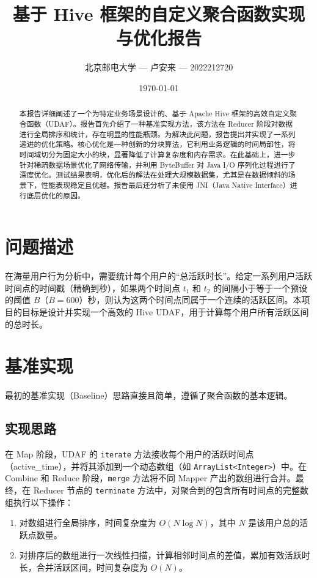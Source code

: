 \documentclass[UTF8]{ctexart}
\title{\textbf{基于 Hive 框架的自定义聚合函数实现与优化报告}}
\author{北京邮电大学 --- 卢安来 --- 2022212720}
\date{\today}
\begin{document}
\maketitle

\begin{abstract}
\noindent 本报告详细阐述了一个为特定业务场景设计的、基于 Apache Hive 框架的高效自定义聚合函数（UDAF）。报告首先介绍了一种基准实现方法，该方法在 Reducer 阶段对数据进行全局排序和统计，存在明显的性能瓶颈。为解决此问题，报告提出并实现了一系列递进的优化策略。核心优化是一种创新的分块算法，它利用业务逻辑的时间局部性，将时间域切分为固定大小的块，显著降低了计算复杂度和内存需求。在此基础上，进一步针对稀疏数据场景优化了网络传输，并利用 ByteBuffer 对 Java I/O 序列化过程进行了深度优化。测试结果表明，优化后的解法在处理大规模数据集，尤其是在数据倾斜的场景下，性能表现稳定且优越。报告最后还分析了未使用 JNI（Java Native Interface）进行底层优化的原因。
\end{abstract}

\newpage
\tableofcontents
\newpage

\section{问题描述}
在海量用户行为分析中，需要统计每个用户的“总活跃时长”。给定一系列用户活跃时间点的时间戳（精确到秒），如果两个时间点 $t_1$ 和 $t_2$ 的间隔小于等于一个预设的阈值 $B$（$B=600$）秒，则认为这两个时间点同属于一个连续的活跃区间。本项目的目标是设计并实现一个高效的 Hive UDAF，用于计算每个用户所有活跃区间的总时长。

\section{基准实现}
最初的基准实现（Baseline）思路直接且简单，遵循了聚合函数的基本逻辑。

\subsection{实现思路}
在 Map 阶段，UDAF 的 \texttt{iterate} 方法接收每个用户的活跃时间点（active\_time），并将其添加到一个动态数组（如 \texttt{ArrayList<Integer>}）中。在 Combine 和 Reduce 阶段，\texttt{merge} 方法将不同 Mapper 产出的数组进行合并。最终，在 Reducer 节点的 \texttt{terminate} 方法中，对聚合到的包含所有时间点的完整数组执行以下操作：
\begin{enumerate}
    \item 对数组进行全局排序，时间复杂度为 $O(N \log N)$，其中 $N$ 是该用户总的活跃点数量。
    \item 对排序后的数组进行一次线性扫描，计算相邻时间点的差值，累加有效活跃时长，合并活跃区间，时间复杂度为 $O(N)$。
\end{enumerate}
\end{document}
